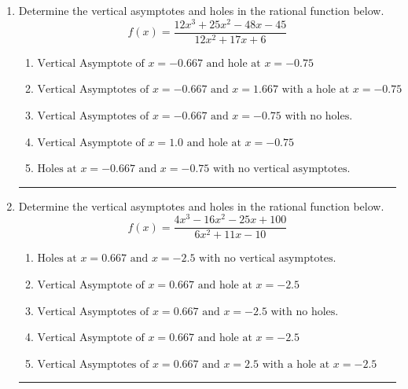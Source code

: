 \documentclass[14pt]{extbook}
\newcommand{\litem}[1]{\item#1\hspace*{-1cm}\rule{\textwidth}{0.4pt}}
\begin{document}
\begin{enumerate}
\litem{
Determine the vertical asymptotes and holes in the rational function below.\[ f(x) = \frac{12x^{3} +25 x^{2} -48 x -45}{12x^{2} +17 x + 6} \]\begin{enumerate}[label=\Alph*.]
\item \( \text{Vertical Asymptote of } x = -0.667 \text{ and hole at } x = -0.75 \)
\item \( \text{Vertical Asymptotes of } x = -0.667 \text{ and } x = 1.667 \text{ with a hole at } x = -0.75 \)
\item \( \text{Vertical Asymptotes of } x = -0.667 \text{ and } x = -0.75 \text{ with no holes.} \)
\item \( \text{Vertical Asymptote of } x = 1.0 \text{ and hole at } x = -0.75 \)
\item \( \text{Holes at } x = -0.667 \text{ and } x = -0.75 \text{ with no vertical asymptotes.} \)

\end{enumerate} }
\litem{
Determine the vertical asymptotes and holes in the rational function below.\[ f(x) = \frac{4x^{3} -16 x^{2} -25 x + 100}{6x^{2} +11 x -10} \]\begin{enumerate}[label=\Alph*.]
\item \( \text{Holes at } x = 0.667 \text{ and } x = -2.5 \text{ with no vertical asymptotes.} \)
\item \( \text{Vertical Asymptote of } x = 0.667 \text{ and hole at } x = -2.5 \)
\item \( \text{Vertical Asymptotes of } x = 0.667 \text{ and } x = -2.5 \text{ with no holes.} \)
\item \( \text{Vertical Asymptote of } x = 0.667 \text{ and hole at } x = -2.5 \)
\item \( \text{Vertical Asymptotes of } x = 0.667 \text{ and } x = 2.5 \text{ with a hole at } x = -2.5 \)


\end{enumerate}}
\end{enumerate}
\end{document}
